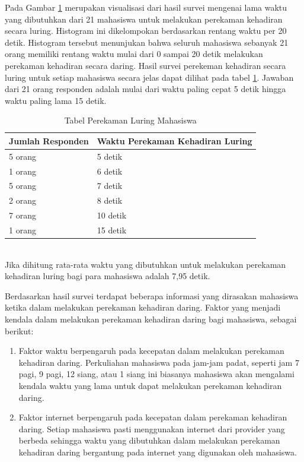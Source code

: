 \begin{enumerate}
\begin{figure}[H]
		\label{fig:LuringMahasiswa}
	\end{figure}
	Pada Gambar \ref{fig:LuringMahasiswa} merupakan visualisasi dari hasil survei mengenai lama waktu yang dibutuhkan dari 21 mahasiswa untuk melakukan perekaman kehadiran secara luring. Histogram ini dikelompokan berdasarkan rentang waktu per 20 detik. Histogram tersebut menunjukan bahwa seluruh mahasiswa sebanyak 21 orang memiliki rentang waktu mulai dari 0 sampai 20 detik melakukan perekaman kehadiran secara daring. Hasil survei perekeman kehadiran secara luring untuk setiap mahasiswa secara jelas dapat dilihat pada tabel \ref{tab:luringMahasiswa}. Jawaban dari 21 orang responden adalah mulai dari waktu paling cepat 5 detik hingga waktu paling lama 15 detik.
	 \begin{table}[ht]			
	  	\caption{Tabel Perekaman Luring Mahasiswa}
	  	\centering
	  	\begin{tabular}{|p{4cm} |p{7cm}|}\hline
	  		Jumlah Responden &  Waktu Perekaman Kehadiran Luring \\ \hline     
	  		5 orang &  5 detik\\ \hline 
	  		1 orang &  6 detik\\ \hline 
	  		5 orang &  7 detik\\ \hline 
	  		2 orang &  8 detik\\ \hline 
	  		7 orang &  10 detik\\ \hline 
	  		1 orang &  15 detik\\ \hline
	  	\end{tabular}
	  	\label{tab:luringMahasiswa}
	 \end{table}\\
	Jika dihitung rata-rata waktu yang dibutuhkan untuk melakukan perekaman kehadiran luring bagi para mahasiswa adalah 7,95 detik.
\end{enumerate}
Berdasarkan hasil survei terdapat beberapa informasi yang dirasakan mahasiswa ketika dalam melakukan perekaman kehadiran daring. Faktor yang menjadi kendala dalam melakukan perekaman kehadiran daring bagi mahasiswa, sebagai berikut:
\begin{enumerate}
	\item Faktor waktu berpengaruh pada kecepatan dalam melakukan perekaman kehadiran daring. Perkuliahan mahasiswa pada jam-jam padat, seperti jam 7 pagi, 9 pagi, 12 siang, atau 1 siang ini biasanya mahasiswa akan mengalami kendala waktu yang lama untuk dapat melakukan perekaman kehadiran daring.
	\item Faktor internet berpengaruh pada kecepatan dalam perekaman kehadiran daring. Setiap mahasiswa pasti menggunakan internet dari provider yang berbeda sehingga waktu yang dibutuhkan dalam melakukan perekaman kehadiran daring bergantung pada internet yang digunakan oleh mahasiswa.
\end{enumerate}

